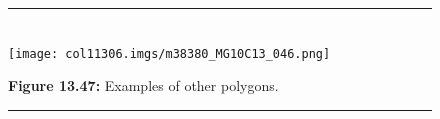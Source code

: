 \begin{table}[H]
{    \addtocounter{footnote}{-0}
    
        }%
      
    \par
  
        
    \setcounter{subfigure}{0}


	\begin{figure}[H] %
    \begin{center}
    \rule[.1in]{\figurerulewidth}{.005in} \\
        \label{m38380*uid93!!!underscore!!!media}\label{m38380*uid93!!!underscore!!!printimage}\texttt{[image: col11306.imgs/m38380\_MG10C13\_046.png]} %
        
      \vspace{2pt}
    \vspace{\rubberspace}\par \begin{cnxcaption}
	  \small \textbf{Figure 13.47: }Examples of other polygons.
	\end{cnxcaption}
      
    \rule[.1in]{\figurerulewidth}{.005in} \\
        
    \end{center}

 \end{figure}   

    \addtocounter{footnote}{-0}
 \vspace{-1cm}   
      \label{m38380*eip-210}

\end{table}
